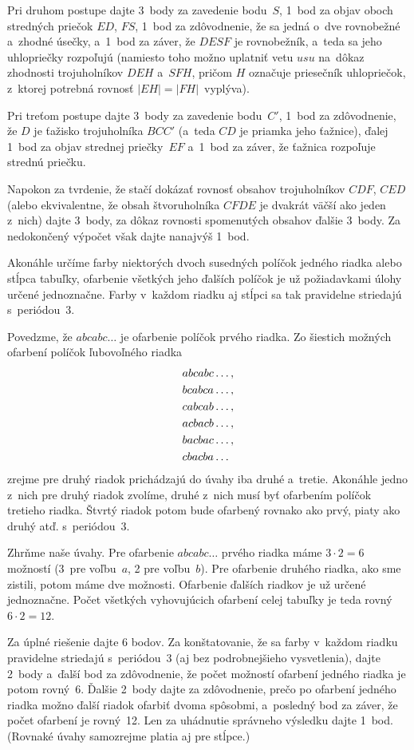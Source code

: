 {Pri druhom postupe dajte 3~body za zavedenie bodu~$S$,
1~bod za objav oboch stredných priečok $ED$, $FS$, 1~bod za zdôvodnenie,
že sa jedná o~dve rovnobežné a~zhodné úsečky,
a~1~bod za záver, že $DESF$ je rovnobežník, a~teda sa jeho uhlopriečky rozpoľujú
(namiesto toho možno uplatniť vetu $usu$ na~dôkaz zhodnosti trojuholníkov $DEH$ a~$SFH$,
pričom $H$ označuje priesečník uhlopriečok, z~ktorej potrebná rovnosť $|EH|=|FH|$~vyplýva).

Pri treťom postupe dajte 3~body za zavedenie bodu~$C'$,
1~bod za zdôvodnenie, že $D$ je ťažisko trojuholníka $BCC'$ (a~teda $CD$ je priamka jeho ťažnice),
ďalej 1~bod za objav strednej priečky~$EF$ a~1~bod za záver, že ťažnica rozpoľuje strednú priečku.

Napokon za tvrdenie, že stačí dokázať rovnosť obsahov trojuholníkov $CDF$, $CED$
(alebo ekvivalentne, že obsah štvoruholníka $CFDE$ je dvakrát väčší ako jeden z~nich)
dajte 3~body, za dôkaz rovnosti spomenutých obsahov ďalšie 3~body.
Za nedokončený výpočet však dajte nanajvýš 1~bod.

\endpetit
}

{%
Akonáhle určíme farby niektorých dvoch susedných políčok
jedného riadka alebo stĺpca tabuľky, ofarbenie všetkých jeho ďalších políčok
je už požiadavkami úlohy určené jednoznačne.
Farby v~každom riadku aj stĺpci sa tak pravidelne striedajú
s~periódou~3.

Povedzme, že $abcabc\dots$ je ofarbenie políčok prvého riadka.
Zo šiestich možných ofarbení políčok ľubovoľného riadka
$$
\aligned
&abcabc\dots,\\
&bcabca\dots,\\
&cabcab\dots,\\
&acbacb\dots,\\
&bacbac\dots,\\
&cbacba\dots
\endaligned
$$
zrejme pre druhý riadok prichádzajú do úvahy iba
druhé a~tretie. Akonáhle jedno z~nich
pre druhý riadok zvolíme, druhé z~nich musí byť ofarbením políčok tretieho riadka.
Štvrtý riadok potom bude ofarbený rovnako ako prvý, piaty ako druhý atď.
s~periódou~3.

Zhrňme naše úvahy. Pre ofarbenie $abcabc\dots$ prvého riadka
máme $3\cdot2=6$ možností (3~pre voľbu~$a$, 2 pre voľbu~$b$).
Pre ofarbenie druhého riadka, ako sme zistili, potom máme dve možnosti. Ofarbenie ďalších
riadkov je už určené jednoznačne.
Počet všetkých vyhovujúcich ofarbení celej tabuľky je teda rovný $6\cdot2=12$.


\nobreak\medskip\petit\noindent
Za úplné riešenie dajte 6 bodov.
Za konštatovanie, že sa farby v~každom riadku
pravidelne striedajú s~periódou~3 (aj bez podrobnejšieho vysvetlenia), dajte 2~body
a~ďalší bod za zdôvodnenie, že počet možností ofarbení jedného riadka
je potom rovný~6.
Ďalšie 2~body dajte za zdôvodnenie, prečo po ofarbení jedného riadka možno ďalší riadok
ofarbiť dvoma spôsobmi, a~posledný bod za záver, že počet ofarbení
je rovný~12. Len za uhádnutie správneho výsledku dajte 1~bod.
(Rovnaké úvahy samozrejme platia aj pre stĺpce.)
\endpetit
\bigbreak}

